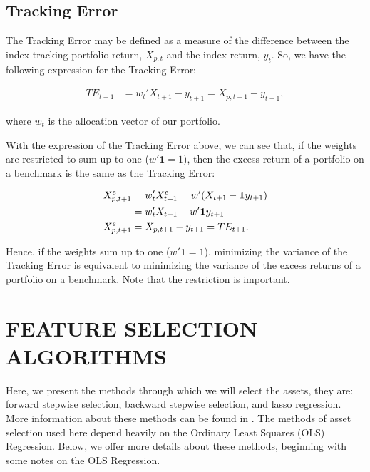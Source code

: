 \documentclass[12pt,oneside,a4paper]{memoir}
\begin{document}
\subsection*{Tracking Error}

The Tracking Error may be defined as a measure of the difference between the index tracking portfolio return, $X_{p,t}$ and the index return, $y_{t}$.
So, we have the following expression for the Tracking Error:

\vspace{-18 pt}
\begin{align} 
	\label{eq:TE}
	TE_{t+1} &= w_{t}'X_{t+1} - y_{t+1} 
	= X_{p, t+1} - y_{t+1},
\end{align}

\noindent
where $w_{t}$ is the allocation vector of our portfolio.

With the expression of the Tracking Error above, we can see that, if the weights are restricted to sum up to one ($w'\mathbf{1}=1$), then the excess return of a portfolio on a benchmark is the same as the Tracking Error:

\vspace{-18 pt}
\begin{align}
	\notag
	X^{e}_{p,t+1} & = w_{t}'X^{e}_{t+1} = w'(X_{t+1} - \mathbf{1} y_{t+1})
	\\
	\notag
	& = w_{t}'X_{t+1} - w'\mathbf{1} y_{t+1}
	\\
	\label{eq:TER}
	X^{e}_{p,t+1} & = X_{p,t+1} - y_{t+1} = TE_{t+1}.
\end{align}

\noindent
Hence, if the weights sum up to one ($w'\mathbf{1}=1$), minimizing the variance of the Tracking Error is equivalent to minimizing the variance of the excess returns of a portfolio on a benchmark.
Note that the restriction is important.

\section{FEATURE SELECTION ALGORITHMS} \label{sec:selection}

Here, we present the methods through which we will select the assets, they are:
forward stepwise selection, backward stepwise selection, and lasso regression.
More information about these methods can be found in .
The methods of asset selection used here depend heavily on the Ordinary Least Squares (OLS) Regression.
Below, we offer more details about these methods, beginning with some notes on the OLS Regression.
\end{document}
